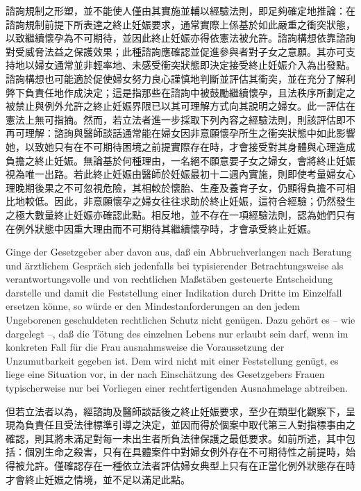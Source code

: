 \documentclass[12pt]{article}
\begin{document}
\begin{transpara}
諮詢規制之形塑，並不能使人僅由其實施並輔以經驗法則，即足夠確定地推論：在諮詢規制前提下所表達之終止妊娠要求，通常實際上係基於如此嚴重之衝突狀態，以致繼續懷孕為不可期待，並因此終止妊娠亦得依憲法被允許。諮詢構想依靠諮詢對受威脅法益之保護效果；此種諮詢應確認並促進參與者對子女之意願。其亦可支持地以婦女通常並非輕率地、未感受衝突狀態即決定接受終止妊娠介入為出發點。諮詢構想也可能適於促使婦女努力良心謹慎地判斷並評估其衝突，並在充分了解利弊下負責任地作成決定；這是指那些在諮詢中被鼓勵繼續懷孕，且法秩序所劃定之被禁止與例外允許之終止妊娠界限已以其可理解方式向其說明之婦女。此一評估在憲法上無可指摘。然而，若立法者進一步採取下列內容之經驗法則，則該評估即不再可理解：諮詢與醫師談話通常能在婦女因非意願懷孕所生之衝突狀態中如此影響她，以致她只有在不可期待困境之前提實際存在時，才會接受對其身體與心理造成負擔之終止妊娠。無論基於何種理由，一名絕不願意要子女之婦女，會將終止妊娠視為唯一出路。若此終止妊娠由醫師於妊娠最初十二週內實施，則即使考量婦女心理晚期後果之不可忽視危險，其相較於懷胎、生產及養育子女，仍顯得負擔不可相比地較低。因此，非意願懷孕之婦女往往求助於終止妊娠，這符合經驗；仍然發生之極大數量終止妊娠亦確認此點。相反地，並不存在一項經驗法則，認為她們只有在例外狀態中因重大理由而不可期待其繼續懷孕時，才會承受終止妊娠。
\end{transpara}

\begin{sourcepara}[title={原文D.99}]
Ginge der Gesetzgeber aber davon aus, daß ein Abbruchverlangen nach Beratung und ärztlichem Gespräch sich jedenfalls bei typisierender Betrachtungsweise als verantwortungsvolle und von rechtlichen Maßstäben gesteuerte Entscheidung darstelle und damit die Feststellung einer Indikation durch Dritte im Einzelfall ersetzen könne, so würde er den Mindestanforderungen an den jedem Ungeborenen geschuldeten rechtlichen Schutz nicht genügen. Dazu gehört es -- wie dargelegt --, daß die Tötung des einzelnen Lebens nur erlaubt sein darf, wenn im konkreten Fall für die Frau ausnahmsweise die Voraussetzung der Unzumutbarkeit gegeben ist. Dem wird nicht mit einer Feststellung genügt, es liege eine Situation vor, in der nach Einschätzung des Gesetzgebers Frauen typischerweise nur bei Vorliegen einer rechtfertigenden Ausnahmelage abtreiben.
\end{sourcepara}
\begin{transpara}
但若立法者以為，經諮詢及醫師談話後之終止妊娠要求，至少在類型化觀察下，呈現為負責任且受法律標準引導之決定，並因而得於個案中取代第三人對指標事由之確認，則其將未滿足對每一未出生者所負法律保護之最低要求。如前所述，其中包括：個別生命之殺害，只有在具體案件中對婦女例外存在不可期待性之前提時，始得被允許。僅確認存在一種依立法者評估婦女典型上只有在正當化例外狀態存在時才會終止妊娠之情境，並不足以滿足此點。
\end{transpara}
\end{document}
